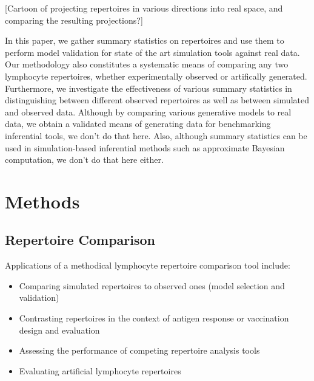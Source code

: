 \documentclass{article}
\begin{document}
[Cartoon of projecting repertoires in various directions into real space, and comparing the resulting projections?]

In this paper, we gather summary statistics on repertoires and use them to perform model validation for state of the art simulation tools against real data.
Our methodology also constitutes a systematic means of comparing any two lymphocyte repertoires, whether experimentally observed or artifically generated.
Furthermore, we investigate the effectiveness of various summary statistics in distinguishing between different observed repertoires as well as between simulated and observed data.
Although by comparing various generative models to real data, we obtain a validated means of generating data for benchmarking inferential tools, we don't do that here.
Also, although summary statistics can be used in simulation-based inferential methods such as approximate Bayesian computation, we don't do that here either.

\section*{Methods}

\subsection*{Repertoire Comparison}

Applications of a methodical lymphocyte repertoire comparison tool include:
\begin{itemize}
\item Comparing simulated repertoires to observed ones (model selection and validation)
\item Contrasting repertoires in the context of antigen response or vaccination design and evaluation
\item Assessing the performance of competing repertoire analysis tools
\item Evaluating artificial lymphocyte repertoires \cite{Finlay2012}
\end{itemize}
\end{document}
